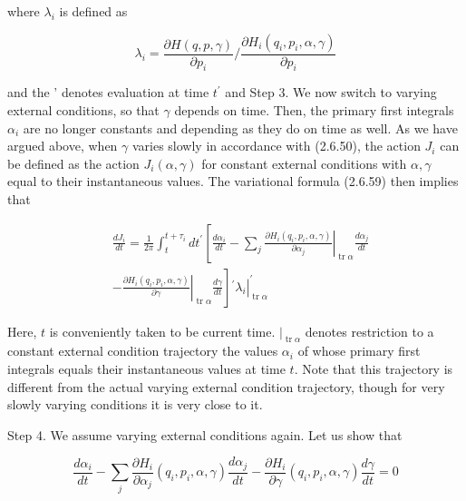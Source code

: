 \documentclass{article}
\begin{document}
where $\lambda_{i}$ is defined as
 
\begin{equation*}
\lambda_{i}=\frac{\partial H(q, p, \gamma)}{\partial p_{i}} / \frac{\partial H_{i}\left(q_{i}, p_{i}, \alpha, \gamma\right)}{\partial p_{i}} \tag{2.6.59}
\end{equation*}
 
and the ' denotes evaluation at time $t^{\prime}$ and
Step 3. We now switch to varying external conditions, so that $\gamma$ depends on time. Then, the primary first integrals $\alpha_{i}$ are no longer constants and depending as they do on
time as well. As we have argued above, when $\gamma$ varies slowly in accordance with (2.6.50), the action $J_{i}$ can be defined as the action $J_{i}(\alpha, \gamma)$ for constant external conditions with $\alpha, \gamma$ equal to their instantaneous values. The variational formula (2.6.59) then implies that
 
\begin{align*}
& \frac{d J_{i}}{d t}=\frac{1}{2 \pi} \int_{t}^{t+\tau_{i}} d t^{\prime}\left[\frac{d \alpha_{i}}{d t}-\left.\sum_{j} \frac{\partial H_{i}\left(q_{i}, p_{i}, \alpha, \gamma\right)}{\partial \alpha_{j}}\right|_{\operatorname{tr} \alpha} \frac{d \alpha_{j}}{d t}\right.  \tag{2.6.60}\\
&\left.-\left.\frac{\partial H_{i}\left(q_{i}, p_{i}, \alpha, \gamma\right)}{\partial \gamma}\right|_{\operatorname{tr} \alpha} \frac{d \gamma}{d t}\right]\left.^{\prime} \lambda_{i}\right|_{\operatorname{tr} \alpha} ^{\prime}
\end{align*}
 

Here, $t$ is conveniently taken to be current time. $\left.\right|_{\operatorname{tr} \alpha}$ denotes restriction to a constant external condition trajectory the values $\alpha_{i}$ of whose primary first integrals equals their instantaneous values at time $t$. Note that this trajectory is different from the actual varying external condition trajectory, though for very slowly varying conditions it is very close to it.

Step 4. We assume varying external conditions again. Let us show that
 
\begin{equation*}
\frac{d \alpha_{i}}{d t}-\sum_{j} \frac{\partial H_{i}}{\partial \alpha_{j}}\left(q_{i}, p_{i}, \alpha, \gamma\right) \frac{d \alpha_{j}}{d t}-\frac{\partial H_{i}}{\partial \gamma}\left(q_{i}, p_{i}, \alpha, \gamma\right) \frac{d \gamma}{d t}=0 \tag{2.6.61}
\end{equation*}
 
\end{document}
